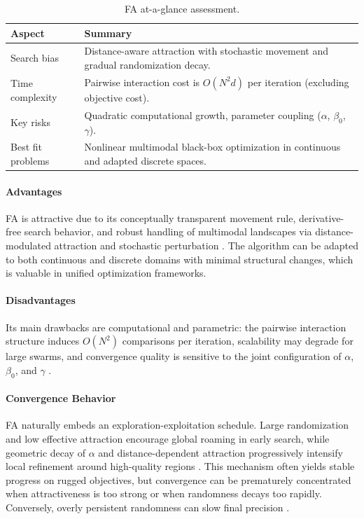 \begin{table}[H]
\centering
\caption{FA at-a-glance assessment.}
\label{tab:fa-profile}
\begin{tabular}{p{3.2cm} p{9.3cm}}
\hline
\textbf{Aspect} & \textbf{Summary} \\
\hline
Search bias & Distance-aware attraction with stochastic movement and gradual randomization decay. \\
Time complexity & Pairwise interaction cost is $O(N^2 d)$ per iteration (excluding objective cost). \\
Key risks & Quadratic computational growth, parameter coupling ($\alpha$, $\beta_0$, $\gamma$). \\
Best fit problems & Nonlinear multimodal black-box optimization in continuous and adapted discrete spaces. \\
\hline
\end{tabular}
\end{table}

\paragraph{Advantages}
FA is attractive due to its conceptually transparent movement rule, derivative-free search behavior, and robust handling of multimodal landscapes via distance-modulated attraction and stochastic perturbation \autocite{Yang2008,YangHe2013}. The algorithm can be adapted to both continuous and discrete domains with minimal structural changes, which is valuable in unified optimization frameworks.

\paragraph{Disadvantages}
Its main drawbacks are computational and parametric: the pairwise interaction structure induces $O(N^2)$ comparisons per iteration, scalability may degrade for large swarms, and convergence quality is sensitive to the joint configuration of $\alpha$, $\beta_0$, and $\gamma$ \autocite{YangHe2013}.

\paragraph{Convergence Behavior}
FA naturally embeds an exploration-exploitation schedule. Large randomization and low effective attraction encourage global roaming in early search, while geometric decay of $\alpha$ and distance-dependent attraction progressively intensify local refinement around high-quality regions \autocite{Yang2008}. This mechanism often yields stable progress on rugged objectives, but convergence can be prematurely concentrated when attractiveness is too strong or when randomness decays too rapidly. Conversely, overly persistent randomness can slow final precision \autocite{YangHe2013}.

